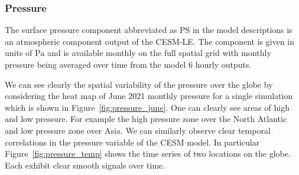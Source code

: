 
\subsubsection{Pressure \label{sssec:pressure}}
The surface pressure component abbreviated as PS in the model descriptions is an atmospheric component output of the CESM-LE.
The component is given in units of $\si{\pascal}$ and is available monthly on the full spatial grid with monthly pressure being averaged over time from the model 6 hourly outputs.

We can see clearly the spatial variability of the pressure over the globe by considering the heat map of June 2021 monthly pressure for a single simulation which is shown in Figure~\ref{fig:pressure_june}.
One can clearly see areas of high and low pressure.
For example the high pressure zone over the North Atlantic and low pressure zone over Asia.
We can similarly observe clear temporal correlations in the pressure variable of the CESM model. In particular Figure~\ref{fig:pressure_temp} shows the time series of two locations on the globe. Each exhibit clear smooth signals over time.

